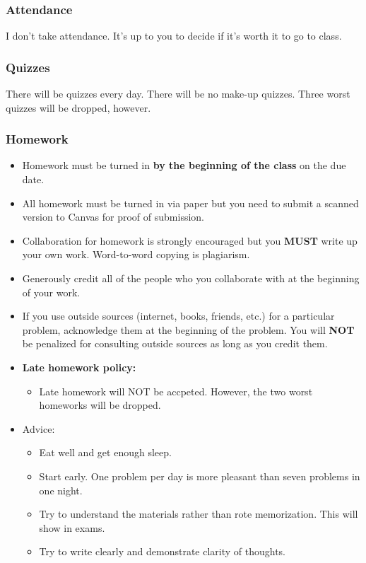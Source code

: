\documentclass[
]{article}
\providecommand{\tightlist}{%
  \setlength{\itemsep}{0pt}\setlength{\parskip}{0pt}}
\begin{document}
\hypertarget{attendance}{%
\subsubsection*{Attendance}\label{attendance}}

I don't take attendance. It's up to you to decide if it's worth it to go to
class.

\hypertarget{quizzes}{%
\subsubsection*{Quizzes}\label{quizzes}}

There will be quizzes every day.
There will be no make-up quizzes.
Three worst quizzes will be dropped, however.

\hypertarget{homework}{%
\subsubsection*{Homework}\label{homework}}

\begin{itemize}
\tightlist
\item
  Homework must be turned in \textbf{by the beginning of the class} on the due date.
\item
  All homework must be turned in via paper but you need to submit a scanned version to Canvas for proof of submission.
\item
  Collaboration for homework is strongly encouraged but you \textbf{MUST} write up your own work. Word-to-word copying is plagiarism.
\item
  Generously credit all of the people who you collaborate with at the beginning of your work.
\item
  If you use outside sources (internet, books, friends, etc.) for a particular problem, acknowledge them at the beginning of the problem.
  You will \textbf{NOT} be penalized for consulting outside sources as long as you credit them.
\item
  \textbf{Late homework policy:}

  \begin{itemize}
  \tightlist
  \item
    Late homework will NOT be accpeted. However, the two worst homeworks will be dropped.
  \end{itemize}
\item
  Advice:

  \begin{itemize}
  \tightlist
  \item
    Eat well and get enough sleep.
  \item
    Start early. One problem per day is more pleasant than seven problems in one night.
  \item
    Try to understand the materials rather than rote memorization. This will show in exams.
  \item
    Try to write clearly and demonstrate clarity of thoughts.
  \end{itemize}
\end{itemize}
\end{document}
